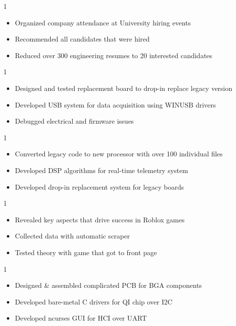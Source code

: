 \documentclass[10pt, letterpaper, ragged2e, withhyper]{AltaCV/altacv}
\def\SDSDSP{1}		%
\def\SDSUSB{1}		%
\def\SDSHIRING{1}		%
\def\RUROBLOXDATA{0}	%
\def\RUWPTRX{1}		%
\begin{document}
\begin{paracol}{2}
\if\SDSHIRING1
\begin{itemize}
\item{Organized company attendance at University hiring events}
\item{Recommended all candidates that were hired}
\item{Reduced over 300 engineering resumes to 20 interested candidates}
\end{itemize}
\fi

\if\SDSUSB1
\begin{itemize}
\item{Designed and tested replacement board to drop-in replace legacy version}
\item{Developed USB system for data acquisition using WINUSB drivers}
\item{Debugged electrical and firmware issues}
\end{itemize}
\fi

\if\SDSDSP1
\begin{itemize}
\item{Converted legacy code to new processor with over 100 individual files}
\item{Developed DSP algorithms for real-time telemetry system}
\item{Developed drop-in replacement system for legacy boards}
\end{itemize}
\fi

\if\RUROBLOXDATA1
\begin{itemize}
\item{Revealed key aspects that drive success in Roblox games}
\item{Collected data with automatic scraper}
\item{Tested theory with game that got to front page}
\end{itemize}
\fi

\if\RUWPTRX1
\begin{itemize}
\item Designed \& assembled complicated PCB for BGA components
\item Developed bare-metal C drivers for QI chip over I2C
\item Developed ncurses GUI for HCI over UART
\end{itemize}
\fi


\end{paracol}
\end{document}
